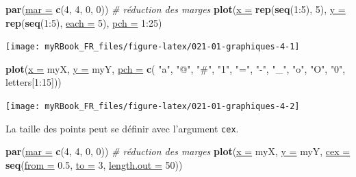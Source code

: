\documentclass[twoside,symmetric]{book}
\newenvironment{Shaded}{}{}
\newcommand{\CommentTok}[1]{\textit{#1}}
\newcommand{\DataTypeTok}[1]{\underline{#1}}
\newcommand{\DecValTok}[1]{#1}
\newcommand{\FloatTok}[1]{#1}
\newcommand{\KeywordTok}[1]{\textbf{#1}}
\newcommand{\NormalTok}[1]{#1}
\newcommand{\OperatorTok}[1]{#1}
\newcommand{\StringTok}[1]{#1}
\begin{document}
\begin{Shaded}
\begin{Highlighting}[]
\KeywordTok{par}\NormalTok{(}\DataTypeTok{mar =} \KeywordTok{c}\NormalTok{(}\DecValTok{4}\NormalTok{, }\DecValTok{4}\NormalTok{, }\DecValTok{0}\NormalTok{, }\DecValTok{0}\NormalTok{)) }\CommentTok{# réduction des marges}
\KeywordTok{plot}\NormalTok{(}\DataTypeTok{x =} \KeywordTok{rep}\NormalTok{(}\KeywordTok{seq}\NormalTok{(}\DecValTok{1}\OperatorTok{:}\DecValTok{5}\NormalTok{), }\DecValTok{5}\NormalTok{), }\DataTypeTok{y =} \KeywordTok{rep}\NormalTok{(}\KeywordTok{seq}\NormalTok{(}\DecValTok{1}\OperatorTok{:}\DecValTok{5}\NormalTok{), }\DataTypeTok{each =} \DecValTok{5}\NormalTok{),}
  \DataTypeTok{pch =} \DecValTok{1}\OperatorTok{:}\DecValTok{25}\NormalTok{)}
\end{Highlighting}
\end{Shaded}

\texttt{[image: myRBook\_FR\_files/figure-latex/021-01-graphiques-4-1]}

\begin{Shaded}
\begin{Highlighting}[]
\KeywordTok{plot}\NormalTok{(}\DataTypeTok{x =}\NormalTok{ myX, }\DataTypeTok{y =}\NormalTok{ myY, }
  \DataTypeTok{pch =} \KeywordTok{c}\NormalTok{(}
    \StringTok{"a"}\NormalTok{, }\StringTok{"@"}\NormalTok{, }\StringTok{"#"}\NormalTok{, }\StringTok{"1"}\NormalTok{, }\StringTok{"="}\NormalTok{, }\StringTok{"-"}\NormalTok{, }\StringTok{"_"}\NormalTok{, }\StringTok{"o"}\NormalTok{, }\StringTok{"O"}\NormalTok{, }\StringTok{"0"}\NormalTok{, }
\NormalTok{    letters[}\DecValTok{1}\OperatorTok{:}\DecValTok{15}\NormalTok{]))}
\end{Highlighting}
\end{Shaded}

\texttt{[image: myRBook\_FR\_files/figure-latex/021-01-graphiques-4-2]}

La taille des points peut se définir avec l'argument \texttt{cex}.

\begin{Shaded}
\begin{Highlighting}[]
\KeywordTok{par}\NormalTok{(}\DataTypeTok{mar =} \KeywordTok{c}\NormalTok{(}\DecValTok{4}\NormalTok{, }\DecValTok{4}\NormalTok{, }\DecValTok{0}\NormalTok{, }\DecValTok{0}\NormalTok{)) }\CommentTok{# réduction des marges}
\KeywordTok{plot}\NormalTok{(}\DataTypeTok{x =}\NormalTok{ myX, }\DataTypeTok{y =}\NormalTok{ myY, }
  \DataTypeTok{cex =} \KeywordTok{seq}\NormalTok{(}\DataTypeTok{from =} \FloatTok{0.5}\NormalTok{, }\DataTypeTok{to =} \DecValTok{3}\NormalTok{, }\DataTypeTok{length.out =} \DecValTok{50}\NormalTok{))}
\end{Highlighting}
\end{Shaded}
\end{document}
